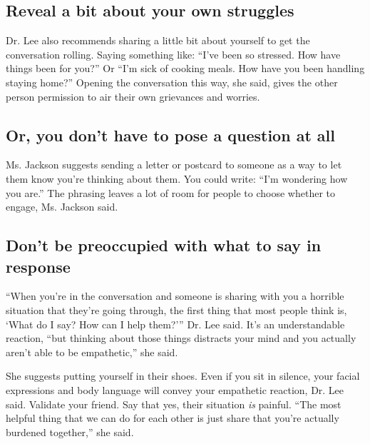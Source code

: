 \hypertarget{reveal-a-bit-about-your-own-struggles}{%
\subsection{Reveal a bit about your own
struggles}\label{reveal-a-bit-about-your-own-struggles}}

Dr. Lee also recommends sharing a little bit about yourself to get the
conversation rolling. Saying something like: ``I've been so stressed.
How have things been for you?'' Or ``I'm sick of cooking meals. How have
you been handling staying home?'' Opening the conversation this way, she
said, gives the other person permission to air their own grievances and
worries.

\hypertarget{or-you-dont-have-to-pose-a-question-at-all}{%
\subsection{Or, you don't have to pose a question at
all}\label{or-you-dont-have-to-pose-a-question-at-all}}

Ms. Jackson suggests sending a letter or postcard to someone as a way to
let them know you're thinking about them. You could write: ``I'm
wondering how you are.'' The phrasing leaves a lot of room for people to
choose whether to engage, Ms. Jackson said.

\hypertarget{dont-be-preoccupied-with-what-to-say-in-response}{%
\subsection{Don't be preoccupied with what to say in
response}\label{dont-be-preoccupied-with-what-to-say-in-response}}

``When you're in the conversation and someone is sharing with you a
horrible situation that they're going through, the first thing that most
people think is, `What do I say? How can I help them?''' Dr. Lee said.
It's an understandable reaction, ``but thinking about those things
distracts your mind and you actually aren't able to be empathetic,'' she
said.

She suggests putting yourself in their shoes. Even if you sit in
silence, your facial expressions and body language will convey your
empathetic reaction, Dr. Lee said. Validate your friend. Say that yes,
their situation \emph{is} painful. ``The most helpful thing that we can
do for each other is just share that you're actually burdened
together,'' she said.

